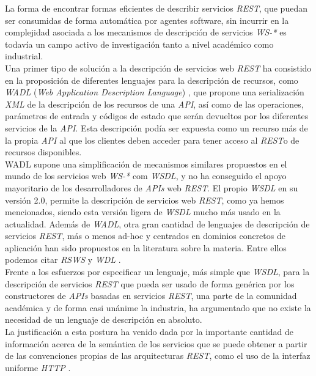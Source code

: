 La forma de encontrar formas eficientes de describir servicios \textit{REST}, que puedan ser consumidas de forma autom\'atica por agentes software, sin incurrir en la complejidad asociada a los mecanismos de  descripci\'on de servicios \textit{WS-*} es todav\'ia un campo activo de investigaci\'on tanto a nivel acad\'emico como industrial.\\
Una primer tipo de soluci\'on a la descripci\'on de servicios web \textit{REST} ha consistido en la proposici\'on de diferentes lenguajes para la descripci\'on de recursos, como \textit{WADL} (\textit{Web Application Description Language}) \cite{wadl}, que propone una serializaci\'on \textit{XML} de la descripci\'on de los recursos de una \textit{API}, as\'i como de las operaciones, par\'ametros de entrada y c\'odigos de estado que ser\'an devueltos por los diferentes servicios de la \textit{API}. Esta descripci\'on pod\'ia ser expuesta como un recurso m\'as de la propia \textit{API} al que los clientes deben acceder para tener acceso al \textit{REST}o de recursos disponibles.\\
WADL supone una simplificaci\'on de mecanismos similares propuestos en el mundo de los servicios web \textit{WS-*} com \textit{WSDL}, y no ha conseguido el apoyo mayoritario de los desarrolladores de \textit{APIs} web \textit{REST}. El propio \textit{WSDL} en su versi\'on 2.0, permite la descripci\'on de servicios web \textit{REST}, como ya hemos mencionados, siendo esta versi\'on ligera de \textit{WSDL} mucho m\'as usado en la actualidad. Adem\'as de \textit{WADL}, otra gran cantidad de lenguajes de descripci\'on de servicios \textit{REST}, m\'as o menos ad-hoc y centrados en dominios concretos de aplicaci\'on han sido propuestos en la literatura sobre la materia. Entre ellos podemos citar \textit{RSWS} y \textit{WDL} \cite{lanthaler2010towards}.\\
Frente a los esfuerzos por especificar un lenguaje, m\'as simple que \textit{WSDL}, para la descripci\'on de servicios \textit{REST} que pueda ser usado de forma gen\'erica por los constructores de \textit{APIs} basadas en servicios \textit{REST}, una parte de la comunidad acad\'emica y de forma casi un\'anime la industria, ha argumentado que no existe la necesidad de un lenguaje de descripci\'on en absoluto.\\
La justificaci\'on a esta postura ha venido dada por la importante cantidad de informaci\'on acerca de la sem\'antica de los servicios que se puede obtener a partir de las convenciones propias de las arquitecturas \textit{REST}, como el uso de la interfaz uniforme \textit{HTTP} \cite{lanthaler2010towards}.\\

